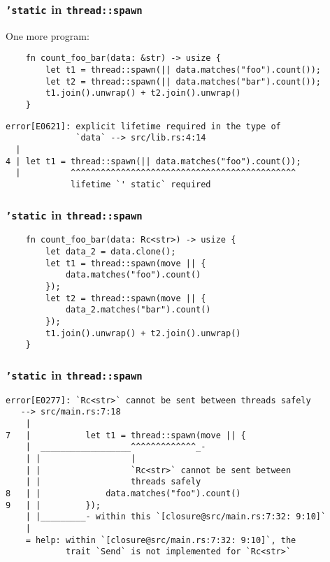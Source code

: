 \documentclass[aspectratio=1610,t]{beamer}
\begin{document}
\begin{frame}[fragile]
\frametitle{\texttt{'static} in \texttt{thread::spawn}}
One more program:

\begin{verbatim}
    fn count_foo_bar(data: &str) -> usize {
        let t1 = thread::spawn(|| data.matches("foo").count());
        let t2 = thread::spawn(|| data.matches("bar").count());
        t1.join().unwrap() + t2.join().unwrap()
    }
\end{verbatim}

\begin{verbatim}
error[E0621]: explicit lifetime required in the type of
              `data` --> src/lib.rs:4:14
  |
4 | let t1 = thread::spawn(|| data.matches("foo").count());
  |          ^^^^^^^^^^^^^^^^^^^^^^^^^^^^^^^^^^^^^^^^^^^^^
             lifetime `' static` required
\end{verbatim}
\end{frame}


\begin{frame}[fragile]
\frametitle{\texttt{'static} in \texttt{thread::spawn}}
\begin{verbatim}
    fn count_foo_bar(data: Rc<str>) -> usize {
        let data_2 = data.clone();
        let t1 = thread::spawn(move || {
            data.matches("foo").count()
        });
        let t2 = thread::spawn(move || {
            data_2.matches("bar").count()
        });
        t1.join().unwrap() + t2.join().unwrap()
    }    
\end{verbatim}
\end{frame}


\begin{frame}[fragile]
\frametitle{\texttt{'static} in \texttt{thread::spawn}}
\begin{verbatim}
error[E0277]: `Rc<str>` cannot be sent between threads safely
   --> src/main.rs:7:18
    |
7   |           let t1 = thread::spawn(move || {
    |  __________________^^^^^^^^^^^^^_-
    | |                  |
    | |                  `Rc<str>` cannot be sent between
    | |                  threads safely
8   | |             data.matches("foo").count()
9   | |         });
    | |_________- within this `[closure@src/main.rs:7:32: 9:10]`
    |
    = help: within `[closure@src/main.rs:7:32: 9:10]`, the
            trait `Send` is not implemented for `Rc<str>`
\end{verbatim}
\end{frame}
\end{document}
